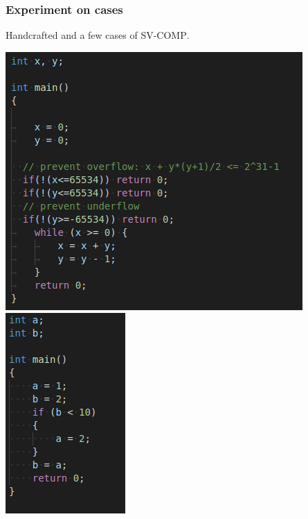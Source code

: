 \documentclass[11pt]{beamer}
\begin{document}
\begin{frame}\frametitle{Experiment on cases}
Handcrafted and a few cases of \textsc{SV-COMP}.

\begin{center}
\includegraphics[scale=0.4]{2nested.png}
\includegraphics[scale=.4]{test4.png}
\end{center}
\end{frame}
\end{document}
